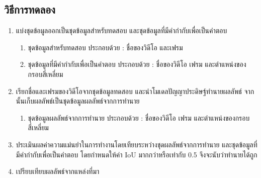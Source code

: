 \subsection*{วิธีการทดลอง}
	\begin{enumerate}
		\setlength\itemsep{-0.25em}
		\item แบ่งชุดข้อมูลออกเป็นชุดข้อมูลสำหรับทดสอบ และชุดข้อมูลที่มีคำกำกับเพื่อเป็นคำตอบ
			\begin{enumerate}
				\setlength\itemsep{-0.25em}
				\item ชุดข้อมูลสำหรับทดสอบ ประกอบด้วย : ชื่อของวิดีโอ และเฟรม
				\item ชุดข้อมูลที่มีคำกำกับเพื่อเป็นคำตอบ ประกอบด้วย : ชื่อของวิดีโอ เฟรม และตำแหน่งของกรอบสี่เหลี่ยม
			\end{enumerate}
		\item เรียกชื่อและเฟรมของวิดีโอจากชุดข้อมูลทดสอบ และนำโมเดลปัญญาประดิษฐ์ทำนายผลลัพธ์ จากนั้นเก็บผลลัพธ์เป็นชุดข้อมูลผลลัพธ์จากการทำนาย
			\begin{enumerate}
				\setlength\itemsep{-0.25em}
				\item ชุดข้อมูลผลลัพธ์จากการทำนาย ประกอบด้วย : ชื่อของวิดีโอ เฟรม และตำแหน่งของกรอบสี่เหลี่ยม
			\end{enumerate}
		\item ประเมินผลค่าความแม่นยำในการทำงานโดยเทียบระหว่างชุดผลลัพธ์จากการทำนาย และชุดข้อมูลที่มีคำกำกับเพื่อเป็นคำตอบ โดยกำหนดให้ค่า IoU มากกว่าหรือเท่ากับ 0.5	
		จึงจะนับว่าทำนายได้ถูก
		\item เปรียบเทียบผลลัพธ์จากแหล่งที่มา
\end{enumerate}
